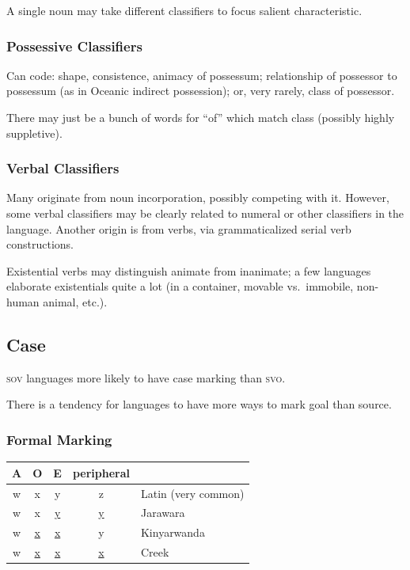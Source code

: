 \documentclass[11pt]{article}
\newcommand{\I}[1]{\textsc{#1}}   %
\begin{document}
A single noun may take different classifiers to focus salient
characteristic.

\subsubsection{Possessive Classifiers}
Can code: shape, consistence, animacy of possessum; relationship of
possessor to possessum (as in Oceanic indirect possession); or, very
rarely, class of possessor.

There may just be a bunch of words for ``of'' which match class
(possibly highly suppletive).

\subsubsection{Verbal Classifiers} 
Many originate from noun incorporation, possibly competing with it.
However, some verbal classifiers may be clearly related to numeral or
other classifiers in the language.  Another origin is from verbs, via
grammaticalized serial verb constructions.

Existential verbs may distinguish animate from inanimate; a few
languages elaborate existentials quite a lot (in a container, movable
vs.\ immobile, non-human animal, etc.).


\subsection{Case}
\I{sov} languages more likely to have case marking than \I{svo}.

There is a tendency for languages to have more ways to mark goal
than source.

\subsubsection{Formal Marking}
\begin{center}
  \begin{tabular}{ccccl}
    A & O & E & peripheral \\
    \hline
    w & x & y & z & Latin (very common) \\
    w & x & \uline{y} & \uline{y} & Jarawara \\
    w & \uline{x} & \uline{x} & y & Kinyarwanda \\
    w & \uline{x} & \uline{x} & \uline{x} & Creek
  \end{tabular}
\end{center}
\end{document}
